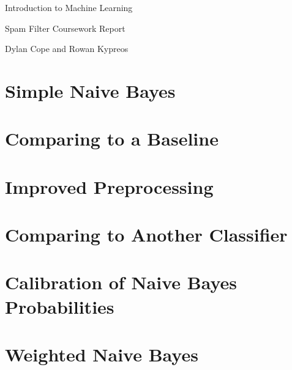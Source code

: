 \documentclass[12pt, a4paper]{article}
\begin{document}
  \vspace{.1in}
	\begin{center}
	{ \Large Introduction to Machine Learning }

  \end{center}
  \begin{center}

    Spam Filter Coursework Report

    Dylan Cope and Rowan Kypreos

	\vspace{.1in}

	\end{center}

  \section*{Simple Naive Bayes}

  \section*{Comparing to a Baseline}

  \section*{Improved Preprocessing}

  \section*{Comparing to Another Classifier}

  \section*{Calibration of Naive Bayes Probabilities}

  \section*{Weighted Naive Bayes}
\end{document}
